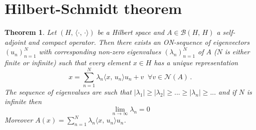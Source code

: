 \documentclass[12pt, a4paper]{article}
\newtheorem{theorem}{Theorem}[section]
\begin{document}
\section{Hilbert-Schmidt theorem}
\begin{theorem}
Let $(H,\, \langle\cdot,\,\cdot\rangle)$ be a Hilbert space and $A\in\mathcal{B}(H,\,H)$ a self-adjoint and compact operator. Then there exists an ON-sequence of eigenvectors $(u_n)_{n=1}^N$ with corresponding non-zero eigenvalues $(\lambda_n)_{n=1}^N$ of $A$ ($N$ is either finite or infinite) such that every element $x\in H$ has a unique representation
\[
x=\sum_{n=1}^N\lambda_n\langle x,\,u_n\rangle u_n+ v\;\;\forall v\in\mathcal{N}(A)\,.
\]
The sequence of eigenvalues are such that $|\lambda_1|\geq|\lambda_2|\geq ...\geq|\lambda_n|\geq...$ and if $N$ is infinite then
\[
    \lim_{n\to\infty} \lambda_n=0
\]
Moreover $A(x)=\sum_{n=1}^N\lambda_n\langle x,\,u_n\rangle u_n$.
\end{theorem}
\end{document}
